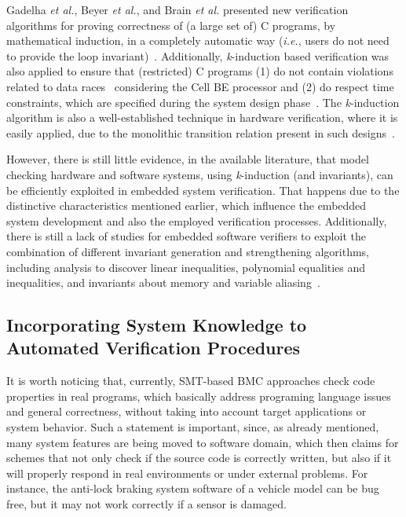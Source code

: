 \documentclass{acm_sen_article}
\begin{document}
Gadelha {\it et al.}, Beyer {\it et al.}, and Brain {\it et al.} presented new verification algorithms for proving correctness of (a large set of) C programs, by mathematical induction, in a completely automatic way ({\it i.e.}, users do not need to provide the loop invariant)~\cite{Gadelha15,Beyer15,Brain15,Rocha15}. Additionally, \textit{k}-induction based verification was also applied to ensure that (restricted) C programs (1) do not contain violations related to data races~\cite{Donaldson10,Kinductor} considering the  Cell BE processor and (2) do respect time constraints, which are specified during the system design phase~\cite{EenS03}. The \textit{k}-induction algorithm is also a well-established technique in hardware verification, where it is easily applied, due to the monolithic transition relation present in such designs~\cite{EenS03,Sheera00,GrosseLD09}. 

However, there is still little evidence, in the available literature, that model checking hardware and software systems, using \textit{k}-induction (and invariants), can be efficiently exploited in embedded system verification. That happens due to the distinctive characteristics mentioned earlier, which influence the embedded system development and also the employed verification processes. Additionally, there is still a lack of studies for embedded software verifiers to exploit the combination of different invariant generation and strengthening algorithms, including analysis to discover linear inequalities, polynomial equalities and inequalities, and invariants about memory and variable aliasing~\cite{Bradley07}.

\subsection{Incorporating System Knowledge to Automated Verification Procedures}

It is worth noticing that, currently, SMT-based BMC approaches check code properties in real programs, which basically address programing language issues and general correctness, without taking into account target applications or system behavior. Such a statement is important, since, as already mentioned, many system features are being moved to software domain, which then claims for schemes that not only check if the source code is correctly written, but also if it will properly respond in real environments or under external problems. For instance, the anti-lock braking system software of a vehicle model can be bug free, but it may not work correctly if a sensor is damaged.
\end{document}
